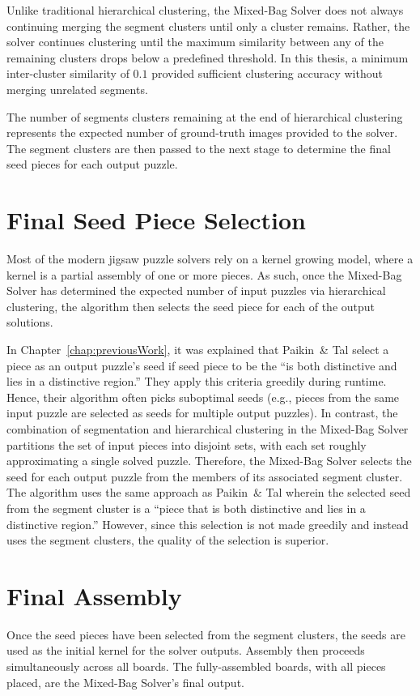 Unlike traditional hierarchical clustering, the Mixed-Bag Solver does not always continuing merging the segment clusters  until only a cluster remains. Rather, the solver continues clustering until the maximum similarity between any of the remaining clusters drops below a predefined threshold.  In this thesis, a minimum inter-cluster similarity of $0.1$ provided sufficient clustering accuracy without merging unrelated segments.

The number of segments clusters remaining at the end of hierarchical clustering represents the expected number of ground-truth images provided to the solver.  The segment clusters are then passed to the next stage to determine the final seed pieces for each output puzzle.

\section{Final Seed Piece Selection}\label{sec:finalSeedPiece}

Most of the modern jigsaw puzzle solvers \cite{pomeranz2011, sholomon2013, paikin2015} rely on a kernel growing model, where a kernel is a partial assembly of one or more pieces.  As such, once the Mixed-Bag Solver has determined the expected number of input puzzles via hierarchical clustering, the algorithm then selects the seed piece for each of the output solutions. 

In Chapter~\ref{chap:previousWork}, it was explained that Paikin~\& Tal select a piece as an output puzzle's seed if seed piece to be the ``is both distinctive and lies in a distinctive region.''  They apply this criteria greedily during runtime.  Hence, their algorithm often picks suboptimal seeds (e.g., pieces from the same input puzzle are selected as seeds for multiple output puzzles).  In contrast, the combination of segmentation and hierarchical clustering in the Mixed-Bag Solver partitions the set of input pieces into disjoint sets, with each set roughly approximating a single solved puzzle.  Therefore, the Mixed-Bag Solver selects the seed for each output puzzle from the members of its associated segment cluster.  The algorithm uses the same approach as Paikin~\& Tal wherein the selected seed from the segment cluster is a ``piece that is both distinctive and lies in a distinctive region.''  However, since this selection is not made greedily and instead uses the segment clusters, the quality of the selection is superior.

\section{Final Assembly}

Once the seed pieces have been selected from the segment clusters, the seeds are used as the initial kernel for the solver outputs.  Assembly then proceeds simultaneously across all boards.  The fully-assembled boards, with all pieces placed, are the Mixed-Bag Solver's final output.